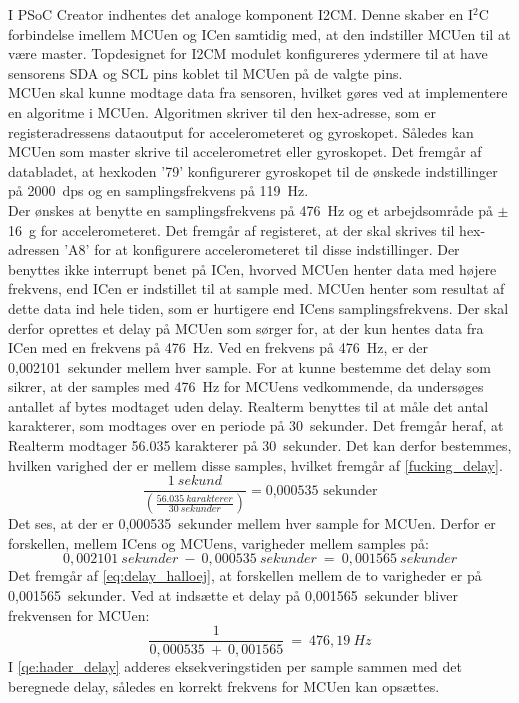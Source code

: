 I PSoC Creator indhentes det analoge komponent I2CM. Denne skaber en I$^2$C forbindelse imellem MCUen og ICen samtidig med, at den indstiller MCUen til at være master. Topdesignet for I2CM modulet konfigureres ydermere til at have sensorens SDA og SCL pins koblet til MCUen på de valgte pins.\\
MCUen skal kunne modtage data fra sensoren, hvilket gøres ved at implementere en algoritme i MCUen. Algoritmen skriver til den hex-adresse, som er registeradressens dataoutput for accelerometeret og gyroskopet. Således kan MCUen som master skrive til accelerometret eller gyroskopet. Det fremgår af databladet, at hexkoden '79' konfigurerer gyroskopet til de ønskede indstillinger på 2000~dps og en samplingsfrekvens på 119~Hz. \citep{STMicroelectronics2016} \\
Der ønskes at benytte en samplingsfrekvens på 476~Hz og et arbejdsområde på $\pm$16~g for accelerometeret. Det fremgår af registeret, at der skal skrives til hex-adressen 'A8' for at konfigurere accelerometeret til disse indstillinger. Der benyttes ikke interrupt benet på ICen, hvorved MCUen henter data med højere frekvens, end ICen er indstillet til at sample med. MCUen henter som resultat af dette data ind hele tiden, som er hurtigere end ICens samplingsfrekvens. Der skal derfor oprettes et delay på MCUen som sørger for, at der kun hentes data fra ICen med en frekvens på 476~Hz. Ved en frekvens på 476~Hz, er der 0,002101~sekunder mellem hver sample. For at kunne bestemme det delay som sikrer, at der samples med 476~Hz for MCUens vedkommende, da undersøges antallet af bytes modtaget uden delay. Realterm benyttes til at måle det antal karakterer, som modtages over en periode på 30~sekunder. Det fremgår heraf, at Realterm modtager 56.035 karakterer på 30~sekunder. Det kan derfor bestemmes, hvilken varighed der er mellem disse samples, hvilket fremgår af \eqref{fucking_delay}.
\begin{equation}\label{fucking_delay}
\frac{1~sekund}{\left(\frac{56.035~karakterer}{30~sekunder}\right)} = \text{0,000535~sekunder}
\end{equation} 
Det ses, at der er 0,000535~sekunder mellem hver sample for MCUen. Derfor er forskellen, mellem ICens og MCUens, varigheder mellem samples på:
\begin{equation}\label{eq:delay_halloej}
0,002101~sekunder~-~0,000535~sekunder~=~0,001565~sekunder
\end{equation} 
Det fremgår af \eqref{eq:delay_halloej}, at forskellen mellem de to varigheder er på 0,001565~sekunder. Ved at indsætte et delay på 0,001565~sekunder bliver frekvensen for MCUen:
\begin{equation}\label{qe:hader_delay}
\frac{1}{0,000535~+~0,001565}~=~476,19~Hz
\end{equation}
I \eqref{qe:hader_delay} adderes eksekveringstiden per sample sammen med det beregnede delay, således en korrekt frekvens for MCUen kan opsættes. 

